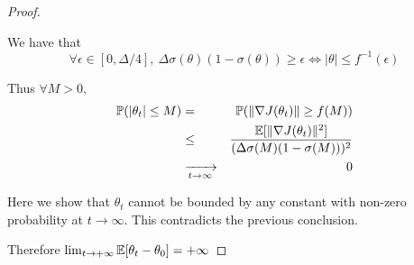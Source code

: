 \begin{proof}
\begin{enumerate}
We have that
$$\forall \epsilon \in [0, \Delta  /4], \ \Delta  \sigma(\theta) (1-\sigma(\theta)) \ge \epsilon \iff |\theta| \le f^{-1}(\epsilon)$$

Thus 
$\forall M > 0,$
\begin{eqnarray*}
{\mathbb{P}}(|\theta_t| \le M) &=& {\mathbb{P}}(\|\nabla J(\theta_t)\| \ge f(M))\\ 
&\le& \frac{\mathbb{E}[\|\nabla J(\theta_t)\|^2]}{( \Delta  \sigma(M) (1-\sigma(M)))^2}\\
&\xrightarrow[t \to \infty]{}& 0
\end{eqnarray*}

Here we show that $\theta_t$ cannot be bounded by any constant with non-zero probability at $t \to \infty$. This contradicts the previous conclusion.

\end{enumerate}
Therefore $\lim_{t \to +\infty} \mathbb{E}[\theta_t - \theta_0] = +\infty$

\end{proof}

